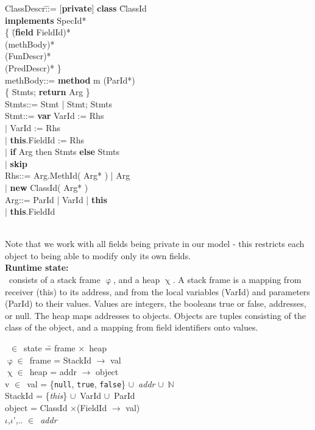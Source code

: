 \documentclass[a4paper,11pt,twoside]{article}
\newenvironment{logic}
{\begin{minipage}[c]{\linewidth}  \sffamily \mdseries \begin{tabbing}}
{\end{tabbing}\end{minipage}\vspace{0.3em}}
\newcommand{\loin}{$\in$}
\newcommand{\losigma}{\text{$\upsigma$}}
\newcommand{\lochi}{$\upchi$}
\newcommand{\lophi}{$\upvarphi$}
\newcommand{\locup} {$\cup$}
\newcommand{\lotimes} {$\times$}
\begin{document}
\begin{logic}
ClassDescr\quad\=:\=:= [\textbf{private}] \textbf{class} \=ClassId\\
\>\>\>\textbf{implements} SpecId*\\
\>\>\{ \=(\textbf{field} FieldId)*\\
\>\>\> (methBody)*\\
\>\>\> (FunDescr)*\\
\>\>\> (PredDescr)* \}\\
methBody\>::= \textbf{method} m (ParId*)\\
\>\>\{ Stmts; \textbf{return} Arg \}\\
Stmts\>::= Stmt | Stmt; Stmts\\
Stmt\>::= \textbf{var} VarId := Rhs\\
\>\>$|$ VarId := Rhs\\
\>\>$|$ \textbf{this}.FieldId := Rhs\\
\>\>$|$ \textbf{if} Arg then Stmts \textbf{else} Stmts\\
\>\>$|$ \textbf{skip}\\
Rhs\>::= Arg.MethId( Arg* ) | Arg\\
\>\>$|$ \textbf{new} ClassId( Arg* )\\
Arg\>::= ParId | VarId | \textbf{this}\\
\>\>$|$ \textbf{this}.FieldId\\
\end{logic}\\
Note that we work with all fields being private in our model - this restricts each object to being able to modify only its own fields.\\

\textbf{Runtime state:}\\
\losigma\ consists of a stack frame \lophi, and a heap \lochi. A stack frame is a mapping from receiver (this) to its address, and from the local variables (VarId) and parameters (ParId) to their values. Values are integers, the booleans true or false, addresses, or null. The heap maps addresses to objects. Objects are tuples consisting of the class of the object, and a mapping from field identifiers onto values.\\

 \begin{logic}
\losigma\ \loin\ state \quad\= = frame \lotimes\ heap \\
\lophi \loin\ frame \>= StackId $\rightarrow$ val \\
\lochi \loin\ heap \>= addr $\rightarrow$ object \\
v \loin\ val \>= \{\texttt{null}, \texttt{true}, \texttt{false}\} \locup\ \textit{addr} \locup\ $\mathbb{N}$ \\
StackId \>= \{\textit{this}\} \locup\ VarId \locup\ ParId \\
object \>= ClassId \lotimes (FieldId $\rightarrow$ val)\\
$\iota$,$\iota$',.. \>\loin\ \textit{addr}\\
\end{logic}
\end{document}
